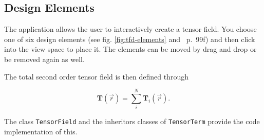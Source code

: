 \documentclass[a4paper,10pt,notitlepage]{scrartcl}
\newcommand{\mat}[1]{\mathbf{#1}}
\begin{document}
\subsection{Design Elements}

The application allows the user to interactively create a tensor field. You
choose one of six design elements (see fig. \ref{fig:tfd-elements} and
\cite{tfd}~p.~99f) and then click into the view space to place it. The
elements can be moved by drag and drop or be removed again as well.

The total second order tensor field is then defined through

\begin{equation}
 \mat{T}(\vec{r}) = \sum_i^N \mat{T}_i(\vec{r}).
 \label{eq:tf}
\end{equation}

The class \texttt{TensorField} and the inheritors classes of
\texttt{TensorTerm} provide the code implementation of this.
\end{document}
